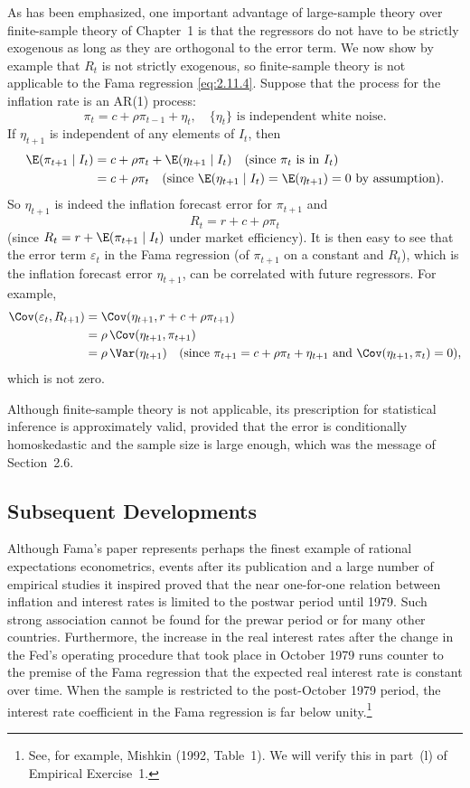 As has been emphasized, one important advantage of large-sample theory over
finite-sample theory of Chapter~1 is that the regressors do not have to be strictly
exogenous as long as they are orthogonal to the error term. We now show by
example that $R_t$ is not strictly exogenous, so finite-sample theory is not applicable
to the Fama regression \eqref{eq:2.11.4}. Suppose that the process for the inflation rate is
an AR(1) process:
\[
\pi_t = c + \rho\pi_{t-1} + \eta_t, \quad
\{\eta_t\} \text{ is independent white noise.}
\]
If $\eta_{t+1}$ is independent of any elements of $I_t$, then
\begin{align*}
\E(\pi_{t+1} \mid I_t)
&= c + \rho\pi_t + \E(\eta_{t+1} \mid I_t)
  \quad (\text{since } \pi_t \text{ is in } I_t) \\
&= c + \rho\pi_t
  \quad (\text{since } \E(\eta_{t+1} \mid I_t) = \E(\eta_{t+1}) = 0 \text{ by assumption}).
\end{align*}
%
So $\eta_{t+1}$ is indeed the inflation forecast error for $\pi_{t+1}$ and
\[
R_t = r + c + \rho\pi_t
\]
(since $R_t = r + \E(\pi_{t+1} \mid I_t)$ under market efficiency). It is then easy to see that
the error term $\varepsilon_t$ in the Fama regression (of $\pi_{t+1}$ on a constant and $R_t$), which is the
inflation forecast error $\eta_{t+1}$, can be correlated with future regressors. For example,
%
\begin{align*}
\Cov(\varepsilon_t, R_{t+1})
&= \Cov(\eta_{t+1}, r + c + \rho\pi_{t+1}) \\
&= \rho\,\Cov(\eta_{t+1}, \pi_{t+1}) \\
&= \rho\,\Var(\eta_{t+1})
  \quad (\text{since } \pi_{t+1} = c + \rho\pi_t + \eta_{t+1}
  \text{ and } \Cov(\eta_{t+1}, \pi_t) = 0),
\end{align*}
%
which is not zero.

Although finite-sample theory is not applicable, its prescription for statistical
inference is approximately valid, provided that the error is conditionally homoskedastic and the sample size is large enough, which was the message of Section~2.6.

\subsection*{Subsequent Developments}

Although Fama's paper represents perhaps the finest example of rational expectations econometrics, events after its publication and a large number of empirical
studies it inspired proved that the near one-for-one relation between inflation and
interest rates is limited to the postwar period until 1979. Such strong association
cannot be found for the prewar period or for many other countries. Furthermore, the
increase in the real interest rates after the change in the Fed's operating procedure
that took place in October 1979 runs counter to the premise of the Fama regression that the expected real interest rate is constant over time. When the sample is
restricted to the post-October 1979 period, the interest rate coefficient in the Fama
regression is far below unity.\footnote{See, for example, Mishkin (1992, Table~1).
We will verify this in part~(l) of Empirical Exercise~1.}

